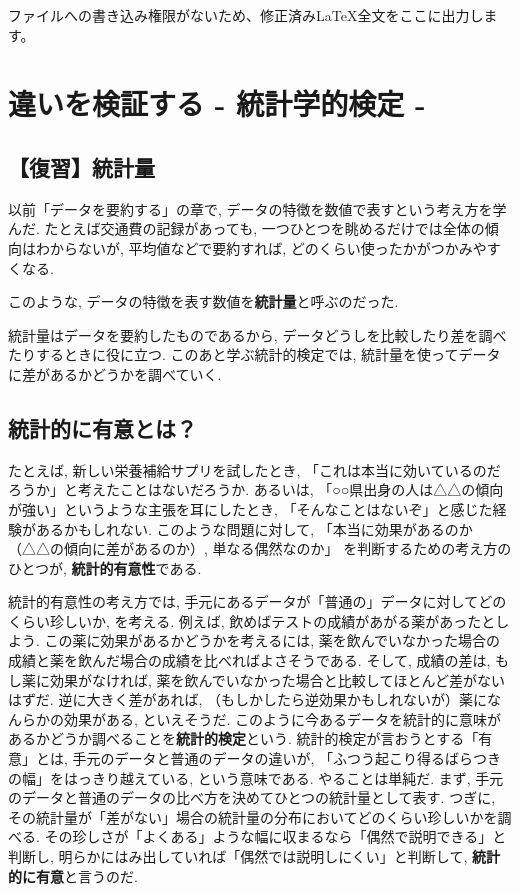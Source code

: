 ﻿ファイルへの書き込み権限がないため、修正済みLaTeX全文をここに出力します。

\section{違いを検証する - 統計学的検定 -}
  \subsection{【復習】統計量}
    以前「データを要約する」の章で, データの特徴を数値で表すという考え方を学んだ.
    たとえば交通費の記録があっても, 一つひとつを眺めるだけでは全体の傾向はわからないが,
    平均値などで要約すれば, どのくらい使ったかがつかみやすくなる.

    このような, データの特徴を表す数値を\textbf{統計量}と呼ぶのだった.

    統計量はデータを要約したものであるから, データどうしを比較したり差を調べたりするときに役に立つ.
    このあと学ぶ統計的検定では, 統計量を使ってデータに差があるかどうかを調べていく.

  \subsection{統計的に有意とは？}

    たとえば, 新しい栄養補給サプリを試したとき,
    「これは本当に効いているのだろうか」と考えたことはないだろうか.
    あるいは, 「○○県出身の人は△△の傾向が強い」というような主張を耳にしたとき,
    「そんなことはないぞ」と感じた経験があるかもしれない.
    このような問題に対して,
    「本当に効果があるのか（△△の傾向に差があるのか）, 単なる偶然なのか」
    を判断するための考え方のひとつが,
    \textbf{統計的有意性}である.

    統計的有意性の考え方では, 手元にあるデータが「普通の」データに対してどのくらい珍しいか, を考える.
    例えば, 飲めばテストの成績があがる薬があったとしよう.
    この薬に効果があるかどうかを考えるには, 薬を飲んでいなかった場合の成績と薬を飲んだ場合の成績を比べればよさそうである.
    そして, 成績の差は, もし薬に効果がなければ, 薬を飲んでいなかった場合と比較してほとんど差がないはずだ.
    逆に大きく差があれば, （もしかしたら逆効果かもしれないが）薬になんらかの効果がある, といえそうだ.
    このように今あるデータを統計的に意味があるかどうか調べることを\textbf{統計的検定}という.
    統計的検定が言おうとする「有意」とは, 手元のデータと普通のデータの違いが, 「ふつう起こり得るばらつきの幅」をはっきり越えている, という意味である.
    やることは単純だ.
    まず, 手元のデータと普通のデータの比べ方を決めてひとつの統計量として表す.
    つぎに, その統計量が「差がない」場合の統計量の分布においてどのくらい珍しいかを調べる.
    その珍しさが「よくある」ような幅に収まるなら「偶然で説明できる」と判断し, 明らかにはみ出していれば「偶然では説明しにくい」と判断して, \textbf{統計的に有意}と言うのだ.

